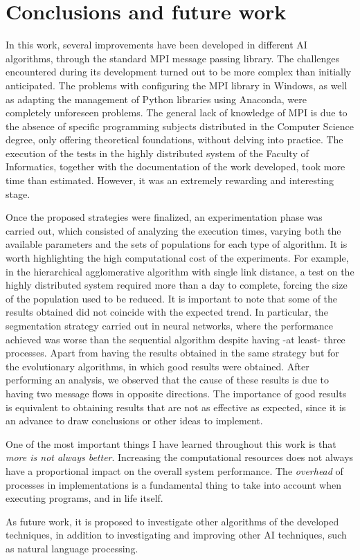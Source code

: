\chapter*{Conclusions and future work}
\label{cap:c5_conclu_en}

	
	In this work, several improvements have been developed in different AI algorithms, through the standard MPI message passing library. The challenges encountered during its development turned out to be more complex than initially anticipated. The problems with configuring the MPI library in Windows, as well as adapting the management of Python libraries using Anaconda, were completely unforeseen problems. The general lack of knowledge of MPI is due to the absence of specific programming subjects distributed in the Computer Science degree, only offering theoretical foundations, without delving into practice. The execution of the tests in the highly distributed system of the Faculty of Informatics, together with the documentation of the work developed, took more time than estimated. However, it was an extremely rewarding and interesting stage.
	
	
	Once the proposed strategies were finalized, an experimentation phase was carried out, which consisted of analyzing the execution times, varying both the available parameters and the sets of populations for each type of algorithm. It is worth highlighting the high computational cost of the experiments. For example, in the hierarchical agglomerative algorithm with single link distance, a test on the highly distributed system required more than a day to complete, forcing the size of the population used to be reduced. It is important to note that some of the results obtained did not coincide with the expected trend. In particular, the segmentation strategy carried out in neural networks, where the performance achieved was worse than the sequential algorithm despite having -at least- three processes. Apart from having the results obtained in the same strategy but for the evolutionary algorithms, in which good results were obtained. After performing an analysis, we observed that the cause of these results is due to having two message flows in opposite directions. The importance of good results is equivalent to obtaining results that are not as effective as expected, since it is an advance to draw conclusions or other ideas to implement.
	
	
	One of the most important things I have learned throughout this work is that \textit{more is not always better}. Increasing the computational resources does not always have a proportional impact on the overall system performance. The \textit{overhead} of processes in implementations is a fundamental thing to take into account when executing programs, and in life itself.	
	
	
	As future work, it is proposed to investigate other algorithms of the developed techniques, in addition to investigating and improving other AI techniques, such as natural language processing.
	
	
	
	
	